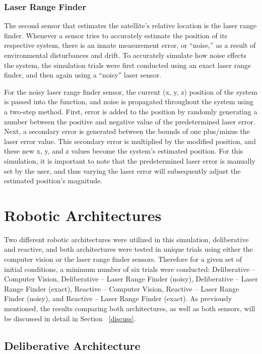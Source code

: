 \documentclass[journal, 10pt]{IEEEtran}
\begin{document}
\subsubsection{Laser Range Finder} \label{laser}
The second sensor that estimates the satellite's relative location is the laser range finder. Whenever a sensor tries to accurately estimate the position of its respective system, there is an innate measurement error, or ``noise,'' as a result of environmental disturbances and drift. To accurately simulate how noise effects the system, the simulation trials were first conducted using an exact laser range finder, and then again using a ``noisy'' laser sensor. 

For the noisy laser range finder sensor, the current (x, y, z) position of the system is passed into the function, and noise is propagated throughout the system using a two-step method. First, error is added to the position by randomly generating a number between the positive and negative value of the predetermined laser error. Next, a secondary error is generated between the bounds of one plus/minus the laser error value. This secondary error is multiplied by the modified position, and these new x, y, and z values become the system's estimated position.  For this simulation, it is important to note that the predetermined laser error is manually set by the user, and thus varying the laser error will subsequently adjust the estimated position's magnitude. 


\section{Robotic Architectures}
Two different robotic architectures were utilized in this simulation, deliberative and reactive, and both architectures were tested in unique trials using either the computer vision or the laser range finder sensors. Therefore for a given set of initial conditions, a minimum number of six trials were conducted: Deliberative -- Computer Vision, Deliberative -- Laser Range Finder (noisy), Deliberative -- Laser Range Finder (exact), Reactive -- Computer Vision, Reactive -- Laser Range Finder (noisy), and Reactive -- Laser Range Finder (exact). As previously mentioned, the results comparing both architectures, as well as both sensors, will be discussed in detail in Section ~\ref{discuss}.

\subsection{Deliberative Architecture}
\end{document}
